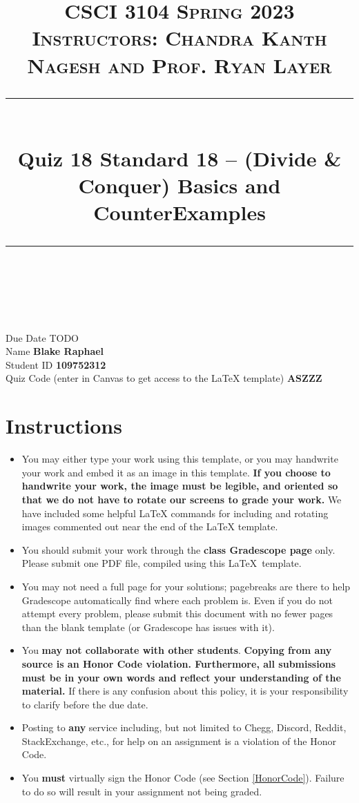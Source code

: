 \documentclass[11pt]{article}
\title{
\normalfont \normalsize 
\textsc{CSCI 3104 Spring 2023 \\ 
Instructors: Chandra Kanth Nagesh and Prof. Ryan Layer} \\
[10pt] 
\rule{\linewidth}{0.5pt} \\[6pt] 
\huge Quiz 18 Standard 18 -- (Divide \& Conquer) Basics and CounterExamples \\
\rule{\linewidth}{2pt}  \\[10pt]
}
\date{}
\theoremstyle{definition}
\theoremstyle{definition}
\theoremstyle{definition}
\begin{document}

\maketitle


\noindent
Due Date \dotfill TODO \\
Name \dotfill \textbf{Blake Raphael} \\
Student ID \dotfill \textbf{109752312} \\
Quiz Code (enter in Canvas to get access to the LaTeX template) \dotfill \textbf{ASZZZ}


\tableofcontents

\section*{Instructions}
 \begin{itemize}
	\item You may either type your work using this template, or you may handwrite your work and embed it as an image in this template. \textbf{If you choose to handwrite your work, the image must be legible, and oriented so that we do not have to rotate our screens to grade your work.} We have included some helpful LaTeX commands for including and rotating images commented out near the end of the LaTeX template.
	\item You should submit your work through the \textbf{class Gradescope page} only. Please submit one PDF file, compiled using this \LaTeX \ template.
	\item You may not need a full page for your solutions; pagebreaks are there to help Gradescope automatically find where each problem is. Even if you do not attempt every problem, please submit this document with no fewer pages than the blank template (or Gradescope has issues with it).

	\item You \textbf{may not collaborate with other students}. \textbf{Copying from any source is an Honor Code violation. Furthermore, all submissions must be in your own words and reflect your understanding of the material.} If there is any confusion about this policy, it is your responsibility to clarify before the due date. 

	\item Posting to \textbf{any} service including, but not limited to Chegg, Discord, Reddit, StackExchange, etc., for help on an assignment is a violation of the Honor Code.

	\item You \textbf{must} virtually sign the Honor Code (see Section \ref{HonorCode}). Failure to do so will result in your assignment not being graded.
\end{itemize}
\end{document}
